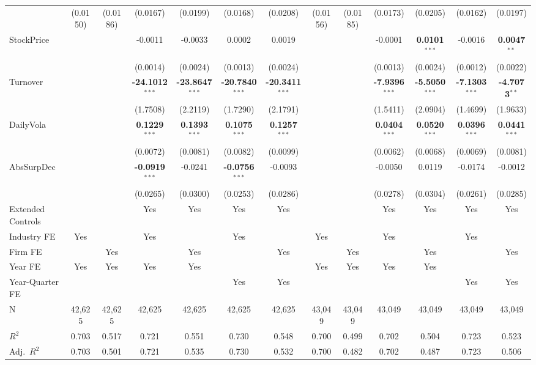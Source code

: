 \begin{landscape}
\begin{table}[H]
\begin{tabular}{lcccccccccccc}
 & (0.0150) & (0.0186) & (0.0167) & (0.0199) & (0.0168) & (0.0208) & (0.0156) & (0.0185) & (0.0173) & (0.0205) & (0.0162) & (0.0197) \\
StockPrice &  &  & -0.0011 & -0.0033 & 0.0002 & 0.0019 &  &  & -0.0001 & \textbf{0.0101}$^{***}$ & -0.0016 & \textbf{0.0047}$^{**}$ \\
 &  &  & (0.0014) & (0.0024) & (0.0013) & (0.0024) &  &  & (0.0013) & (0.0024) & (0.0012) & (0.0022) \\
Turnover &  &  & \textbf{-24.1012}$^{***}$ & \textbf{-23.8647}$^{***}$ & \textbf{-20.7840}$^{***}$ & \textbf{-20.3411}$^{***}$ &  &  & \textbf{-7.9396}$^{***}$ & \textbf{-5.5050}$^{***}$ & \textbf{-7.1303}$^{***}$ & \textbf{-4.7073}$^{**}$ \\
 &  &  & (1.7508) & (2.2119) & (1.7290) & (2.1791) &  &  & (1.5411) & (2.0904) & (1.4699) & (1.9633) \\
DailyVola &  &  & \textbf{0.1229}$^{***}$ & \textbf{0.1393}$^{***}$ & \textbf{0.1075}$^{***}$ & \textbf{0.1257}$^{***}$ &  &  & \textbf{0.0404}$^{***}$ & \textbf{0.0520}$^{***}$ & \textbf{0.0396}$^{***}$ & \textbf{0.0441}$^{***}$ \\
 &  &  & (0.0072) & (0.0081) & (0.0082) & (0.0099) &  &  & (0.0062) & (0.0068) & (0.0069) & (0.0081) \\
AbsSurpDec &  &  & \textbf{-0.0919}$^{***}$ & -0.0241 & \textbf{-0.0756}$^{***}$ & -0.0093 &  &  & -0.0050 & 0.0119 & -0.0174 & -0.0012 \\
 &  &  & (0.0265) & (0.0300) & (0.0253) & (0.0286) &  &  & (0.0278) & (0.0304) & (0.0261) & (0.0285) \\
\midrule
Extended Controls &  &  & Yes & Yes & Yes & Yes &  &  & Yes & Yes & Yes & Yes \\
Industry FE & Yes &  & Yes &  & Yes &  & Yes &  & Yes &  & Yes &  \\
Firm FE &  & Yes &  & Yes &  & Yes &  & Yes &  & Yes &  & Yes \\
Year FE & Yes & Yes & Yes & Yes &  &  & Yes & Yes & Yes & Yes &  &  \\
Year-Quarter FE &  &  &  &  & Yes & Yes &  &  &  &  & Yes & Yes \\
\midrule
N & 42,625 & 42,625 & 42,625 & 42,625 & 42,625 & 42,625 & 43,049 & 43,049 & 43,049 & 43,049 & 43,049 & 43,049 \\
$R^2$ & 0.703 & 0.517 & 0.721 & 0.551 & 0.730 & 0.548 & 0.700 & 0.499 & 0.702 & 0.504 & 0.723 & 0.523 \\
Adj.~$R^2$ & 0.703 & 0.501 & 0.721 & 0.535 & 0.730 & 0.532 & 0.700 & 0.482 & 0.702 & 0.487 & 0.723 & 0.506 \\

\end{tabular}
\end{table}
\end{landscape}
